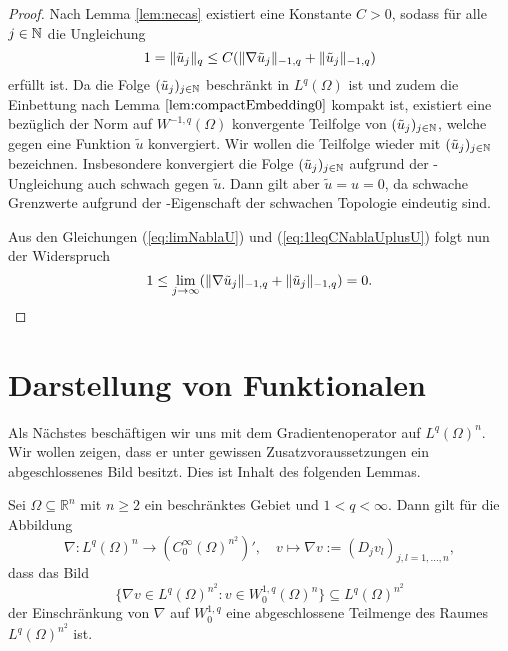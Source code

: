\begin{proof}
  Nach Lemma \ref{lem:necas} existiert eine Konstante $C > 0$, sodass für alle $j \in \mathbb{N}$ die Ungleichung
  \begin{equation}
    \label{eq:1leqCNablaUplusU}
    1 = \lVert \tilde u_j \rVert_q \leq C (\lVert \nabla \tilde u_j \rVert_{-1,q} + \lVert \tilde u_j \rVert_{-1,q})
  \end{equation}
  erfüllt ist.
  Da die Folge $(\tilde u_j)_{j \in \mathbb{N}}$ beschränkt in $L^q(\Omega)$ ist und zudem die Einbettung nach Lemma $\ref{lem:compactEmbedding0}$ kompakt ist, existiert eine bezüglich der Norm auf $W^{-1,q}(\Omega)$ konvergente Teilfolge von $(\tilde u_j)_{j \in \mathbb{N}}$, welche gegen eine Funktion $\tilde u$ konvergiert. 
  Wir wollen die Teilfolge wieder mit $(\tilde u_j)_{j \in \mathbb{N}}$ bezeichnen.
  Insbesondere konvergiert die Folge $(\tilde u_j)_{j \in \mathbb{N}}$ aufgrund der \hoelder\hyp{}Ungleichung auch schwach gegen $\tilde u$.
  Dann gilt aber $\tilde u = u = 0$, da schwache Grenzwerte aufgrund der \hausdorff\hyp{}Eigenschaft der schwachen Topologie eindeutig sind.

  Aus den Gleichungen (\ref{eq:limNablaU}) und (\ref{eq:1leqCNablaUplusU}) folgt nun der Widerspruch
  \begin{displaymath}
  1 \leq \lim_{j \to \infty} ( \lVert \nabla \tilde u_j  \rVert_{-1,q} + \lVert \tilde u_j \rVert_{-1,q} ) = 0.\qedhere
  \end{displaymath}
\end{proof}

\section{Darstellung von Funktionalen}

Als Nächstes beschäftigen wir uns mit dem Gradientenoperator auf $L^q(\Omega)^n$.
Wir wollen zeigen, dass er unter gewissen Zusatzvoraussetzungen ein abgeschlossenes Bild besitzt.
Dies ist Inhalt des folgenden Lemmas.

\begin{lem}
  \label{lem:closedImageGradient}
  Sei $\Omega \subseteq \mathbb{R}^n$ mit $n \geq 2$ ein beschränktes Gebiet und $1 < q < \infty$.
  Dann gilt für die Abbildung
  $$
  \nabla \colon L^{q}(\Omega)^{n} \to (C_0^\infty(\Omega)^{n^2})',
  \quad v \mapsto \nabla v := (D_j v_l)_{j,l=1,\dots,n}, 
  $$
  dass das Bild
  $$
  \{\nabla v \in L^{q}(\Omega)^{n^2} \colon v \in W_0^{1,q}(\Omega)^n\} \subseteq L^{q}(\Omega)^{n^2}
  $$
  der Einschränkung von $\nabla$ auf $W_0^{1,q}$ eine abgeschlossene Teilmenge des Raumes $L^q(\Omega)^{n^2}$ ist.
\end{lem}

